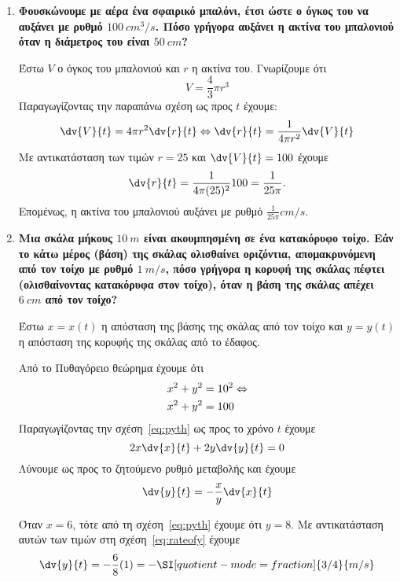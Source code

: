 \begin{enumerate}
  \item {\bfseries \boldmath    Φουσκώνουμε με αέρα ένα σφαιρικό μπαλόνι, έτσι
      ώστε ο όγκος του να αυξάνει με ρυθμό $\SI{100}{cm^{3}\per s}$. Πόσο γρήγορα
    αυξάνει η ακτίνα του μπαλονιού όταν η διάμετρος του είναι $\SI{50}{cm}$?}
    \begin{solution}
      Έστω $V$ ο όγκος του μπαλονιού και $r$ η ακτίνα του.
      Γνωρίζουμε ότι
      \[
        V=\frac{4}{3}\pi r^{3}
      \]
      Παραγωγίζοντας την παραπάνω σχέση ως προς $t$ έχουμε:
      \[
        \dv{V}{t} = 4\pi r^{2}\dv{r}{t} \Leftrightarrow
        \dv{r}{t} = \frac{1}{4\pi r^{2}}\dv{V}{t}
      \]
      Με αντικατάσταση των τιμών $r=25$ και $\dv{V}{t}=100$ έχουμε
      \[
        \dv{r}{t} = \frac{1}{4\pi (25)^{2}}100 = \frac{1}{25\pi}.
      \]
      Επομένως, η ακτίνα του μπαλονιού αυξάνει με ρυθμό $\frac{1}{25\pi}\si{cm\per s}$.
    \end{solution}

  \item {\bfseries \boldmath Μια σκάλα μήκους $\SI{10}{m}$ είναι ακουμπησμένη
      σε ένα κατακόρυφο τοίχο. Εάν το κάτω μέρος (βάση) της σκάλας ολισθαίνει
      οριζόντια, απομακρυνόμενη από τον τοίχο με ρυθμό $\SI{1}{m\per s}$, πόσο
      γρήγορα η κορυφή της σκάλας πέφτει (ολισθαίνοντας κατακόρυφα στον τοίχο), όταν η
    βάση της σκάλας απέχει $\SI{6}{cm}$ από τον τοίχο?}
    \begin{solution}
      Έστω $x=x(t)$ η απόσταση της βάσης της σκάλας από τον τοίχο και $y=y(t)$ η 
      απόσταση της κορυφής της σκάλας από το έδαφος.

      Από το Πυθαγόρειο θεώρημα έχουμε ότι
      \begin{align}\label{eq:pyth}
        x^{2}+y^{2}&=10^{2}  \notag \Leftrightarrow \\
        x^{2}+y^{2}&=100
      \end{align}
      Παραγωγίζοντας την σχέση~\eqref{eq:pyth} ως προς το χρόνο $t$ έχουμε
      \[
        2x\dv{x}{t} + 2y\dv{y}{t} = 0
      \]
      Λύνουμε ως προς το ζητούμενο ρυθμό μεταβολής και έχουμε
      \begin{equation}\label{eq:rateofy}
        \dv{y}{t} = -\frac{x}{y}\dv{x}{t}
      \end{equation}

      Όταν $x=6$, τότε από τη σχέση~\eqref{eq:pyth} έχουμε ότι $y=8$. Με αντικατάσταση 
      αυτών των τιμών στη σχέση~\eqref{eq:rateofy} έχουμε
      \[
        \dv{y}{t} = -\frac{6}{8}(1) = -\SI[quotient-mode=fraction]{3/4}{m/s}
      \]


\end{solution}
\end{enumerate}
